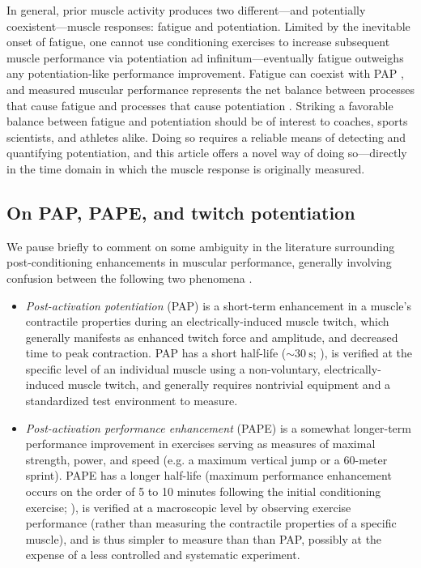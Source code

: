\documentclass[utf8]{FrontiersinHarvard}
\begin{document}
In general, prior muscle activity produces two different---and potentially coexistent---muscle responses: fatigue and potentiation.
Limited by the inevitable onset of fatigue, one cannot use conditioning exercises to increase subsequent muscle performance via potentiation ad infinitum---eventually fatigue outweighs any potentiation-like performance improvement.
Fatigue can coexist with PAP \citep{rassier}, and measured muscular performance represents the net balance between processes that cause fatigue and processes that cause potentiation \citep{rassier}.
Striking a favorable balance between fatigue and potentiation should be of interest to coaches, sports scientists, and athletes alike.
Doing so requires a reliable means of detecting and quantifying potentiation, and this article offers a novel way of doing so---directly in the time domain in which the muscle response is originally measured.

\subsection{On PAP, PAPE, and twitch potentiation}
We pause briefly to comment on some ambiguity in the literature surrounding post-conditioning enhancements in muscular performance,
generally involving confusion between the following two phenomena \citep{prieske}.
\begin{itemize}

    \item \textit{Post-activation potentiation} (PAP) is a short-term enhancement in a muscle's contractile properties during an electrically-induced muscle twitch, which generally manifests as enhanced twitch force and amplitude, and decreased time to peak contraction.
    PAP has a short half-life ($ \sim \SI{30}{\second} $; \cite{vandervoort}),
    is verified at the specific level of an individual muscle using a non-voluntary, electrically-induced muscle twitch, and generally requires nontrivial equipment and a standardized test environment to measure.

    \item \textit{Post-activation performance enhancement} (PAPE) is
    a somewhat longer-term performance improvement in exercises serving as measures of maximal strength, power, and speed (e.g. a maximum vertical jump or a 60-meter sprint).
    PAPE has a longer half-life (maximum performance enhancement occurs on the order of 5 to 10 minutes following the initial conditioning exercise; \cite{wilson}),
    is verified at a macroscopic level by observing exercise performance (rather than measuring the contractile properties of a specific muscle),
    and is thus simpler to measure than than PAP, possibly at the expense of a less controlled and systematic experiment.

\end{itemize}
\end{document}
